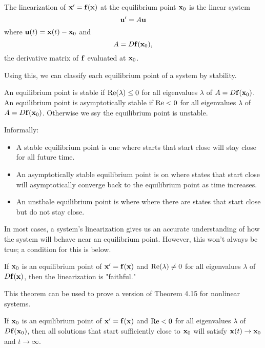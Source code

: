 \documentclass[../m082main.tex]{subfiles}
\begin{document}
\begin{theorem}
    The linearization of $\mathbf{x}'= \mathbf{f} (\mathbf{x})$ at the equilibrium point $\mathbf{x}_0$ is the linear system
    \[ \mathbf{u}' = A \mathbf{u} \]
    where $\mathbf{u}(t) = \mathbf{x}(t) - \mathbf{x}_0$ and
    \[ A = D \mathbf{f} (\mathbf{x}_0), \]
    the derivative matrix of $\mathbf{f}$ evaluated at $\mathbf{x}_0$.
\end{theorem}

Using this, we can classify each equilibrium point of a system by stability.

\begin{definition}
    An equilibrium point is stable if $\textrm{Re} (\lambda) \leq 0$ for all eigenvalues $\lambda$ of $A = D \mathbf{f} (\mathbf{x}_0)$.
    An equilibrium point is asymptotically stable if $\textrm{Re} < 0$ for all eigenvalues $\lambda$ of $A = D \mathbf{f} (\mathbf{x}_0)$.
    Otherwise we ssy the equilibrium point is unstable.
\end{definition}

Informally:
\begin{itemize}
    \item A stable equilibrium point is one where starts that start close will stay close for all future time.
    \item An asymptotically stable equilibrium point is on where states that start close will asymptotically converge back to the equilibrium point as time increases.
    \item An unstbale equilibrium point is where where there are states that start close but do not stay close.
\end{itemize}
In most cases, a system's linearization gives us an accurate understanding of how the system will behave near an equilibrium point.
However, this won't always be true; a condition for this is below.

\begin{theorem}
    If $\mathbf{x}_0$ is an equilibrium point of $\mathbf{x}'= \mathbf{f}(\mathbf{x})$ and $\textrm{Re} (\lambda) \neq 0$ for all eigenvalues $\lambda$ of $D \mathbf{f} (\mathbf{x})$, then the linearization is "faithful."
\end{theorem}

This theorem can be used to prove a version of Theorem 4.15 for nonlinear systems.

\begin{theorem}
    If $\mathbf{x}_0$ is an equilibrium point of $\mathbf{x}' = \mathbf{f} (\mathbf{x})$ and $\textrm{Re} < 0$ for all eigenvalues $\lambda$ of $D \mathbf{f} (\mathbf{x}_0)$, then all solutions that start sufficiently close to $\mathbf{x}_0$ will satisfy $\mathbf{x}(t) \to \mathbf{x}_0$ and $t \to \infty$.
\end{theorem}
\end{document}
